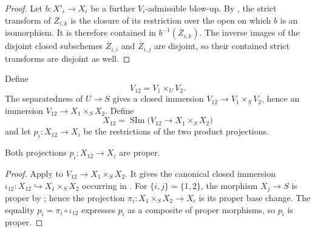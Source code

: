 \begin{proof}
  Let $b\colon X'_i\to X_i$ be a further $V_i$-admissible blow-up.  By
  , the strict transform of
  $\overline Z_{i,k}$ is the closure of its restriction over the open on
  which $b$ is an isomorphism.  It is therefore contained in
  $b^{-1}(\overline Z_{i,k})$.  The inverse images of the disjoint closed
  subschemes $\overline Z_{i,i}$ and $\overline Z_{i,j}$ are disjoint, so
  their contained strict transforms are disjoint as well.
\end{proof}

\begin{definition}
  \label{def:nagata-two-open-comparison-space}

  Define
  \[
    V_{12}=V_1\times_UV_2.
  \]
  The separatedness of $U\to S$ gives a closed immersion
  $V_{12}\to V_1\times_SV_2$, hence an immersion
  $V_{12}\to X_1\times_SX_2$.  Define
  \[
    X_{12}=\operatorname{SIm}
      \bigl(V_{12}\longrightarrow X_1\times_SX_2\bigr)
  \]
  and let $p_i\colon X_{12}\to X_i$ be the restrictions of the two product
  projections.
\end{definition}


\begin{lemma}
  \label{lemma:nagata-comparison-projections-proper}

  Both projections $p_i\colon X_{12}\to X_i$ are proper.
\end{lemma}

\begin{proof}
  Apply  to
  $V_{12}\to X_1\times_SX_2$.  It gives the canonical closed immersion
  $\iota_{12}\colon X_{12}\hookrightarrow X_1\times_SX_2$ occurring in
  .  For
  $\{i,j\}=\{1,2\}$, the morphism $X_j\to S$ is proper by
  ; hence the projection
  $\pi_i\colon X_1\times_SX_2\to X_i$ is its proper base change.  The
  equality $p_i=\pi_i\circ\iota_{12}$ expresses $p_i$ as a composite of
  proper morphisms, so $p_i$ is proper.
\end{proof}

